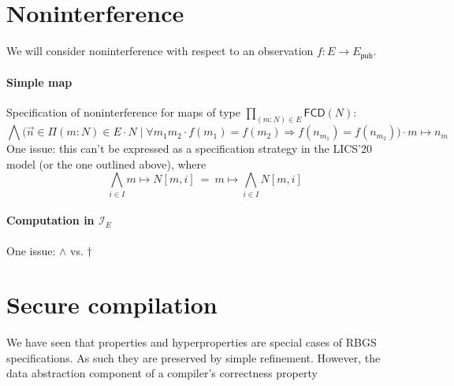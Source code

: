 \documentclass[11pt]{article}
\begin{document}

\newpage
\section{Noninterference} %

We will consider noninterference
with respect to an observation $f : E \rightarrow E_\mathsf{pub}$.

\paragraph{Simple map}

Specification of noninterference for maps of type
$\prod_{(m \mathbin: N) \in E} \mathsf{FCD}(N)$:
\[
  \bigwedge \big(
      \vec{n} \in \Pi {(m \mathbin: N) \in E} \cdot N \mid
      \forall m_1 m_2 \cdot f(m_1) = f(m_2) \Rightarrow f(n_{m_1}) = f(n_{m_2})
  \big) \cdot
  m \mapsto n_{m}
\]
One issue: this can't be expressed as a specification strategy
in the LICS'20 model (or the one outlined above),
where \[
  \bigwedge_{i \in I} m \mapsto N[m,i] \:=\:
  m \mapsto\bigwedge_{i \in I} N[m,i]
\]

\paragraph{Computation in $\mathcal{I}_E$}

One issue: $\wedge$ vs. $\dagger$



\newpage
\section{Secure compilation} %

We have seen that properties and hyperproperties
are special cases of RBGS specifications.
As such they are preserved by simple refinement.
However,
the data abstraction component of a compiler's correctness property

\end{document}
